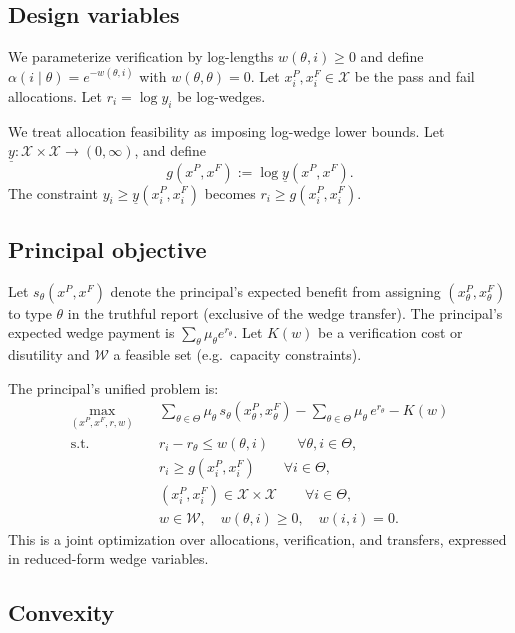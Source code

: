 \documentclass[final,3p,times]{elsarticle}
\theoremstyle{plain}
\theoremstyle{definition}
\newcommand{\1}{\mathbbm{1}}
\newcommand{\ThetaSet}{\Theta}
\newcommand{\cX}{\mathcal{X}}
\newcommand{\cW}{\mathcal{W}}
\begin{document}
\subsection{Design variables}

We parameterize verification by log-lengths $w(\theta,i)\ge 0$ and define $\alpha(i\mid\theta)=e^{-w(\theta,i)}$ with $w(\theta,\theta)=0$. Let $x_i^P,x_i^F\in\cX$ be the pass and fail allocations. Let $r_i=\log y_i$ be log-wedges.

We treat allocation feasibility as imposing log-wedge lower bounds. Let $\underline y:\cX\times\cX\to(0,\infty)$, and define
\[
g(x^P,x^F):=\log \underline y(x^P,x^F).
\]
The constraint $y_i\ge \underline y(x_i^P,x_i^F)$ becomes $r_i\ge g(x_i^P,x_i^F)$.

\subsection{Principal objective}

Let $s_\theta(x^P,x^F)$ denote the principal's expected benefit from assigning $(x_\theta^P,x_\theta^F)$ to type $\theta$ in the truthful report (exclusive of the wedge transfer). The principal's expected wedge payment is $\sum_\theta \mu_\theta e^{r_\theta}$. Let $K(w)$ be a verification cost or disutility and $\cW$ a feasible set (e.g.\ capacity constraints). 

The principal's unified problem is:
\begin{equation}\label{eq:CP}
\begin{aligned}
\max_{(x^P,x^F,r,w)}\quad
& \sum_{\theta\in\ThetaSet}\mu_\theta\, s_\theta(x_\theta^P,x_\theta^F)
-\sum_{\theta\in\ThetaSet}\mu_\theta\,e^{r_\theta}-K(w)\\
\text{s.t.}\quad
& r_i-r_\theta \le w(\theta,i)\qquad \forall \theta,i\in\ThetaSet,\\
& r_i \ge g(x_i^P,x_i^F)\qquad \forall i\in\ThetaSet,\\
& (x_i^P,x_i^F)\in \cX\times\cX\qquad \forall i\in\ThetaSet,\\
& w\in \cW,\quad w(\theta,i)\ge 0,\quad w(i,i)=0.
\end{aligned}
\end{equation}
This is a joint optimization over allocations, verification, and transfers, expressed in reduced-form wedge variables.

\subsection{Convexity}
\end{document}
